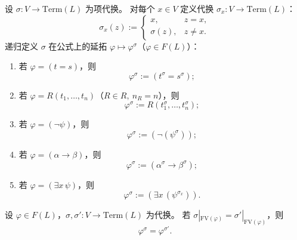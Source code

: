 \documentclass[lang=cn,a4paper,newtx,section]{elegantbook}
\begin{document}
 \begin{definition}[公式的代换]
 \label{substitution-on-formulas}
 设 $\sigma:V\to\mathrm{Term}(L)$ 为项代换。
 对每个 $x\in V$ 定义代换 $\sigma_x:V\to\mathrm{Term}(L)$：
 \[
   \sigma_x(z):=
   \begin{cases}
     x, & z=x,\\
     \sigma(z), & z\neq x.
   \end{cases}
 \]
 递归定义 $\sigma$ 在公式上的延拓 $\varphi\longmapsto\varphi^{\sigma}$（$\varphi\in F(L)$）：
 \begin{enumerate}
   \item 若 $\varphi=(t=s)$，则
   \[
     \varphi^{\sigma}:=(t^{\sigma}=s^{\sigma});
   \]
   \item 若 $\varphi=R(t_1,\dots,t_n)$（$R\in R,\ n_R=n$），则
   \[
     \varphi^{\sigma}:=R(t_1^{\sigma},\dots,t_n^{\sigma});
   \]
   \item 若 $\varphi=(\neg\psi)$，则
   \[
     \varphi^{\sigma}:=(\neg(\psi^{\sigma}));
   \]
   \item 若 $\varphi=(\alpha\to\beta)$，则
   \[
     \varphi^{\sigma}:=(\alpha^{\sigma}\to\beta^{\sigma});
   \]
   \item 若 $\varphi=(\exists x\,\psi)$，则
   \[
     \varphi^{\sigma}:=(\exists x\,(\psi^{\sigma_x})).
   \]
 \end{enumerate}
 \end{definition}

 \begin{lemma}[公式代换只依赖自由变量]
 \label{substitution-depends-on-free-vars}
 设 $\varphi\in F(L)$，$\sigma,\sigma':V\to\mathrm{Term}(L)$ 为代换。
 若 $\sigma|_{\mathrm{FV}(\varphi)}=\sigma'|_{\mathrm{FV}(\varphi)}$，则
 \[
   \varphi^{\sigma}=\varphi^{\sigma'}.
 \]
 \end{lemma}
\end{document}
